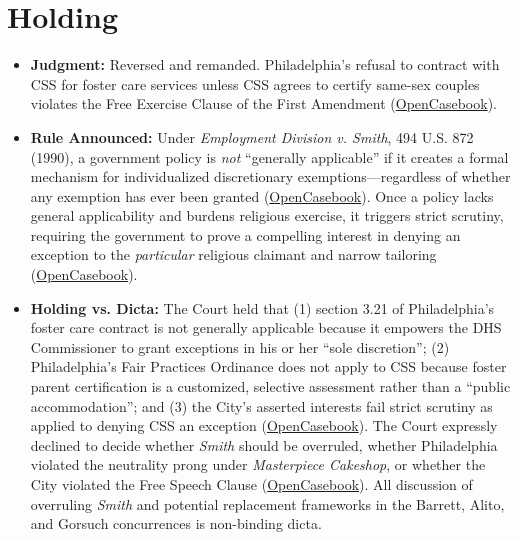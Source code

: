 \documentclass[12pt]{article}
\begin{document}
\section{Holding}
\begin{itemize}
    \item \textbf{Judgment:} Reversed and remanded. Philadelphia's refusal to contract with CSS for foster care services unless CSS agrees to certify same-sex couples violates the Free Exercise Clause of the First Amendment (\href{https://opencasebook.org/casebooks/4501-constitutional-law/resources/12.9-fulton-v-city-of-philadelphia-2020/}{OpenCasebook}).
    \item \textbf{Rule Announced:} Under \textit{Employment Division v. Smith}, 494 U.S. 872 (1990), a government policy is \emph{not} ``generally applicable'' if it creates a formal mechanism for individualized discretionary exemptions---regardless of whether any exemption has ever been granted (\href{https://opencasebook.org/casebooks/4501-constitutional-law/resources/12.9-fulton-v-city-of-philadelphia-2020/}{OpenCasebook}). Once a policy lacks general applicability and burdens religious exercise, it triggers strict scrutiny, requiring the government to prove a compelling interest in denying an exception to the \emph{particular} religious claimant and narrow tailoring (\href{https://opencasebook.org/casebooks/4501-constitutional-law/resources/12.9-fulton-v-city-of-philadelphia-2020/}{OpenCasebook}).
    \item \textbf{Holding vs. Dicta:} The Court held that (1) section 3.21 of Philadelphia's foster care contract is not generally applicable because it empowers the DHS Commissioner to grant exceptions in his or her ``sole discretion''; (2) Philadelphia's Fair Practices Ordinance does not apply to CSS because foster parent certification is a customized, selective assessment rather than a ``public accommodation''; and (3) the City's asserted interests fail strict scrutiny as applied to denying CSS an exception (\href{https://opencasebook.org/casebooks/4501-constitutional-law/resources/12.9-fulton-v-city-of-philadelphia-2020/}{OpenCasebook}). The Court expressly declined to decide whether \textit{Smith} should be overruled, whether Philadelphia violated the neutrality prong under \textit{Masterpiece Cakeshop}, or whether the City violated the Free Speech Clause (\href{https://opencasebook.org/casebooks/4501-constitutional-law/resources/12.9-fulton-v-city-of-philadelphia-2020/}{OpenCasebook}). All discussion of overruling \textit{Smith} and potential replacement frameworks in the Barrett, Alito, and Gorsuch concurrences is non-binding dicta.
\end{itemize}
\end{document}
